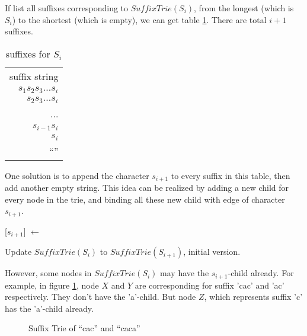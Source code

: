 \documentclass{article}
\begin{document}
If list all suffixes corresponding to $SuffixTrie(S_i)$, from the longest
(which is $S_i$) to the shortest (which is empty), we can get
table \ref{tab:suffixes_s_i}. There are total $i+1$ suffixes.

\begin{table}
  \begin{tabular}{r}
    suffix string \\
    $s_1s_2s_3...s_i$ \\
    $s_2s_3...s_i$ \\
    ... \\
    $s_{i-1}s_i$ \\
    $s_i$ \\
    ``'' \\
  \end{tabular}
  \caption{suffixes for $S_i$}
  \label{tab:suffixes_s_i}
\end{table}

One solution is to append the character $s_{i+1}$ to every suffix in this
table, then add another empty string. This idea can be realized by adding
a new child for every node in the trie, and binding all these new
child with edge of character $s_{i+1}$.

\begin{algorithm}
\begin{algorithmic}[1]
  \State {}[$s_{i+1}$] $\gets$ 
\EndFor
\end{algorithmic}
\caption{Update $SuffixTrie(S_i)$ to $SuffixTrie(S_{i+1})$, initial version.}
\label{algo:strie1}
\end{algorithm}

However, some nodes in $SuffixTrie(S_i)$ may have the $s_{i+1}$-child already.
For example, in figure \ref{fig:strie-cac}, node $X$ and $Y$ are corresponding
for suffix 'cac' and 'ac' respectively. They don't have the 'a'-child.
But node $Z$, which represents suffix 'c' has the 'a'-child already.

\begin{figure}[htbp]
  \centering
  \caption{Suffix Trie of ``cac'' and ``caca''}
  \label{fig:strie-cac}
\end{figure}
\end{document}
